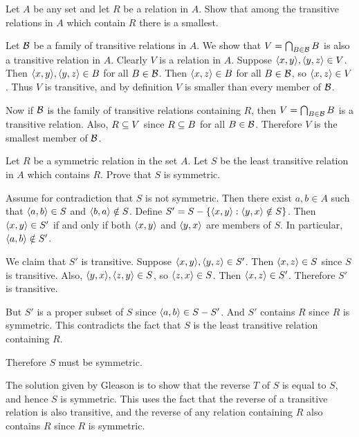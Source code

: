 \begin{exercise}
Let $A$ be any set and let $R$ be a relation in $A$. Show that among the transitive
relations in $A$ which contain $R$ there is a smallest.
\end{exercise}
 
\begin{solution}
Let $\mathcal{B}$ be a family of transitive relations in $A$. We show that $V=\bigcap_{B\in\mathcal{B}}B$
is also a transitive relation in $A$.
Clearly $V$ is a relation in $A$.
Suppose $\aprn{x,y},\aprn{y,z}\in V$.
Then $\aprn{x,y},\aprn{y,z}\in B$ for all $B\in\mathcal{B}$.
Then $\left\langle x,z\right\rangle\in B$ for all $B\in\mathcal{B}$, so $\left\langle x,z\right\rangle\in V$.
Thus $V$ is transitive, and by definition $V$ is smaller than every member of $\mathcal{B}$.

Now if $\mathcal{B}$ is the family of transitive relations containing $R$, then $V=\bigcap_{B\in\mathcal{B}}B$
is a transitive relation. Also, $R\subseteq V$ since $R\subseteq B$ for all $B\in\mathcal{B}$.
Therefore $V$ is the smallest member of $\mathcal{B}$.
\end{solution}

\begin{exercise}
Let $R$ be a symmetric relation in the set $A$. Let $S$ be the least transitive relation in
$A$ which contains $R$. Prove that $S$ is symmetric.
\end{exercise}

\begin{solution}
Assume for contradiction that $S$ is not symmetric.
Then there exist $a,b\in A$ such that $\left\langle a,b\right\rangle\in S$ and $\left\langle b,a\right\rangle\notin S$.
Define $S'=S-\left\{ \left\langle x,y\right\rangle : \left\langle y,x\right\rangle\notin S \right\}$.
Then $\left\langle x,y\right\rangle\in S'$ if and only if both $\left\langle x,y\right\rangle$ and $\left\langle y,x\right\rangle$ are members of $S$.
In particular, $\left\langle a,b\right\rangle\notin S'$.

We claim that $S'$ is transitive.
Suppose $\aprn{x,y},\aprn{y,z}\in S'$. Then $\left\langle x,z\right\rangle\in S$ since $S$ is transitive.
Also, $\aprn{y,x},\aprn{z,y}\in S$, so $\left\langle z,x\right\rangle\in S$.
Then $\left\langle x,z\right\rangle\in S'$.
Therefore $S'$ is transitive.

But $S'$ is a proper subset of $S$ since $\left\langle a,b\right\rangle\in S-S'$. And $S'$ contains $R$ since
$R$ is symmetric. This contradicts the fact that $S$ is the least transitive relation containing $R$.

Therefore $S$ must be symmetric.

The solution given by Gleason is to show that the reverse $T$ of $S$ is equal to $S$, and hence
$S$ is symmetric. This uses the fact that the reverse of a transitive relation is also transitive,
and the reverse of any relation containing $R$ also contains $R$ since $R$ is symmetric.
\end{solution}

